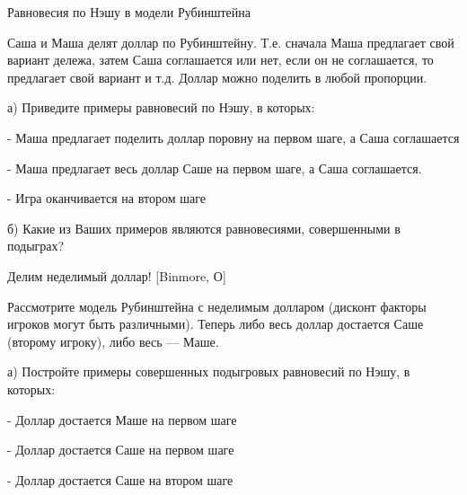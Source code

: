 \begin{problem}
 Равновесия по Нэшу в модели Рубинштейна\par
Саша и Маша делят доллар по Рубинштейну. Т.е. сначала Маша предлагает свой вариант дележа, затем Саша соглашается или нет, если он не соглашается, то предлагает свой вариант и т.д. Доллар можно поделить в любой пропорции.\par
а) Приведите примеры равновесий по Нэшу, в которых:\par
- Маша предлагает поделить доллар поровну на первом шаге, а Саша соглашается\par
- Маша предлагает весь доллар Саше на первом шаге, а Саша соглашается.\par
- Игра оканчивается на втором шаге\par
б) Какие из Ваших примеров являются равновесиями, совершенными в подыграх?



\begin{sol}

\end{sol}
\end{problem}



\begin{problem}
 Делим неделимый доллар! [Binmore, О]\par
Рассмотрите модель Рубинштейна с неделимым долларом (дисконт факторы игроков могут быть различными). Теперь либо весь доллар достается Саше (второму игроку), либо весь — Маше.\par
а) Постройте примеры совершенных подыгровых равновесий по Нэшу, в которых:\par
- Доллар достается Маше на первом шаге\par
- Доллар достается Саше на первом шаге\par
- Доллар достается Саше на втором шаге\par



\begin{sol}

\end{sol}
\end{problem}



